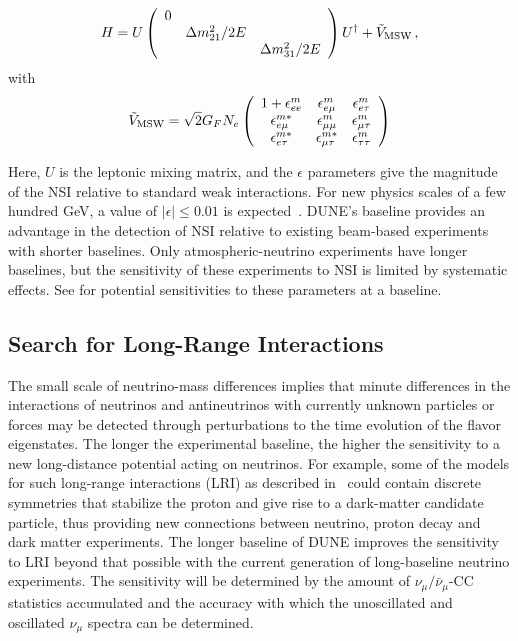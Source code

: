 \begin{equation}
  H = U \left( \begin{array}{ccc}
           0 &                    & \\
             & \Delta m_{21}^2/2E & \\
             &                    & \Delta m_{31}^2/2E
         \end{array} \right) U^\dag + \tilde{V}_{\rm MSW} \,,
\end{equation}
with
\begin{equation}
  \tilde{V}_{\rm MSW} = \sqrt{2} G_F N_e
\left(
  \begin{array}{ccc}
    1 + \epsilon^m_{ee}       & \epsilon^m_{e\mu}       & \epsilon^m_{e\tau}  \\
        \epsilon^{m*}_{e\mu}  & \epsilon^m_{\mu\mu}     & \epsilon^m_{\mu\tau} \\
        \epsilon^{m*}_{e\tau} & \epsilon^{m*}_{\mu\tau} & \epsilon^m_{\tau\tau}
  \end{array} 
\right)
\end{equation}

Here, $U$ is the leptonic mixing matrix, and the $\epsilon$ parameters give the
magnitude of the NSI relative to standard weak interactions.  For new physics
scales of a few hundred GeV,  a value of $|\epsilon| \leq 0.01$ is
expected~\cite{Davidson:2003ha,GonzalezGarcia:2007ib,Biggio:2009nt,Barranco:2007ej,Escrihuela:2011cf}.
DUNE's  baseline provides an advantage in the detection of NSI relative
to existing beam-based experiments with shorter baselines.
Only atmospheric-neutrino experiments have longer baselines, but the sensitivity
of these experiments to NSI is limited by systematic effects. See \cite{Adams:2013qkq}
for potential sensitivities to these parameters at a  baseline.

\subsection{Search for Long-Range Interactions}

The small scale of neutrino-mass differences implies that minute
differences in the interactions of neutrinos and antineutrinos with
currently unknown particles or forces may be detected through 
perturbations to the time evolution of the flavor eigenstates.  
The longer the experimental
baseline, the higher the sensitivity to a new long-distance potential
acting on neutrinos. For example, some of the models for such
long-range interactions (LRI) as described in~\cite{Davoudiasl:2011sz} could contain discrete symmetries that
stabilize the proton and give rise to a dark-matter candidate particle,
thus providing new
connections between neutrino, proton decay and dark matter
experiments. The longer baseline of DUNE improves the sensitivity to
LRI beyond that possible with the current generation of long-baseline
neutrino experiments. The sensitivity will be determined by the amount
of $\nu_\mu/\bar{\nu}_\mu$-CC statistics accumulated and the accuracy
with which the unoscillated and oscillated $\nu_\mu$ spectra can be
determined.

